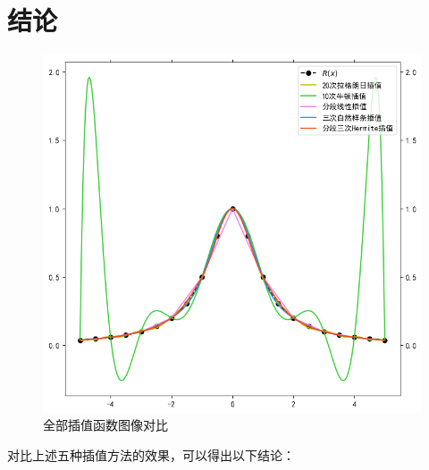 \documentclass[UTF8,ctexart,a4paper,11pt,openany]{article}
\theoremstyle{definition}
\begin{document}
\section{结论}
    \begin{figure}[H]
        \centering
        \includegraphics{pics/P3.6.png}
        \caption{全部插值函数图像对比}
        \label{graph:1}
        \end{figure}
\;对比上述五种插值方法的效果，可以得出以下结论：
\end{document}
